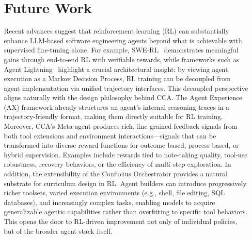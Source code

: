 \section{Future Work}

Recent advances suggest that reinforcement learning (RL) can substantially enhance LLM-based software engineering agents beyond what is achievable with supervised fine-tuning alone. For example, SWE-RL~\citep{wei2025swe} demonstrates meaningful gains through end-to-end RL with verifiable rewards, while frameworks such as Agent Lightning~\citep{luo2025agentlightningtrainai} highlight a crucial architectural insight: by viewing agent execution as a Markov Decision Process, RL training can be decoupled from agent implementation via unified trajectory interfaces.
This decoupled perspective aligns naturally with the design philosophy behind CCA. The Agent Experience (AX) framework already structures an agent’s internal reasoning traces in a trajectory-friendly format, making them directly suitable for RL training. Moreover, CCA’s Meta-agent produces rich, fine-grained feedback signals from both tool extensions and environment interactions—signals that can be transformed into diverse reward functions for outcome-based, process-based, or hybrid supervision. Examples include rewards tied to note-taking quality, tool-use robustness, recovery behaviors, or the efficiency of multi-step exploration.
In addition, the extensibility of the Confucius Orchestrator provides a natural substrate for curriculum design in RL. Agent builders can introduce progressively richer toolsets, varied execution environments (e.g., shell, file editing, SQL databases), and increasingly complex tasks, enabling models to acquire generalizable agentic capabilities rather than overfitting to specific tool behaviors. This opens the door to RL-driven improvement not only of individual policies, but of the broader agent stack itself.


\clearpage


